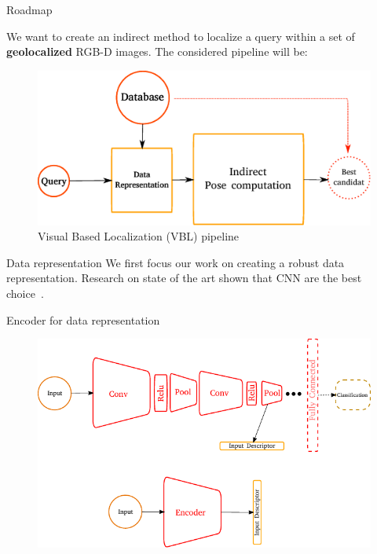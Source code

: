 \begin{frame}{Roadmap}

	We want to create an indirect method to localize a query within a set of \textbf{geolocalized} RGB-D images. The considered pipeline will be:
	
	\begin{figure}
		\includegraphics{vect/keys_comp_indirect.pdf}		
		\caption{Visual Based Localization (VBL) pipeline}
	\end{figure}		
		
\end{frame}

\begin{frame}{Data representation}
	We first focus our work on creating a robust data representation. Research on state of the art shown that CNN are the best choice~\cite{Arandjelovic2017}.
	
	\begin{block}{Encoder for data representation}
		\begin{figure}[c]
			\includegraphics[width=0.75\linewidth]{vect/encodeur.pdf}					
		\end{figure}
	\end{block}
	
\end{frame}

